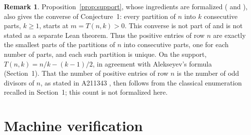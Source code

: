 \documentclass[11pt]{amsart}
\theoremstyle{plain}
\theoremstyle{definition}
\newtheorem{remark}[theorem]{Remark}
\begin{document}
\begin{remark}\label{rem:converse}
Proposition~\ref{prop:support}, whose ingredients are formalized ( and ), also gives the converse of Conjecture~1: every partition of $n$ into $k$ consecutive parts, $k\ge1$, starts at $m=T(n,k)>0$. This converse is not part of  and is not stated as a separate Lean theorem. Thus the positive entries of row $n$ are exactly the smallest parts of the partitions of $n$ into consecutive parts, one for each number of parts, and each such partition is unique. On the support, $T(n,k)=n/k-(k-1)/2$, in agreement with Alekseyev's formula (Section~1). That the number of positive entries of row $n$ is the number of odd divisors of $n$, as stated in A211343 \cite{A211343}, then follows from the classical enumeration recalled in Section~1; this count is not formalized here.
\end{remark}

\section{Machine verification}\label{sec:lean}
\end{document}
